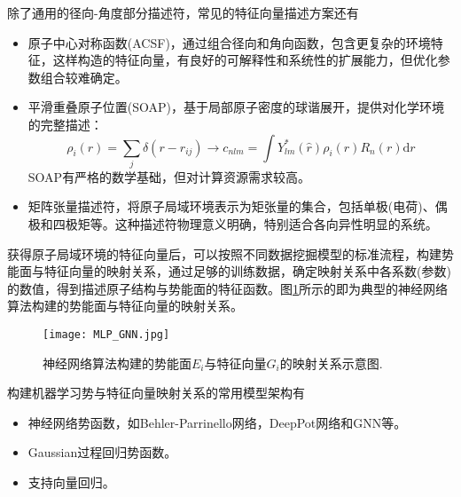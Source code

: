 除了通用的径向-角度部分描述符，常见的特征向量描述方案还有
\begin{itemize}
	\item 原子中心对称函数\textrm{(ACSF)}，通过组合径向和角向函数，包含更复杂的环境特征，这样构造的特征向量，有良好的可解释性和系统性的扩展能力，但优化参数组合较难确定。
	\item 平滑重叠原子位置\textrm{(SOAP)}，基于局部原子密度的球谐展开，提供对化学环境的完整描述：
		\begin{equation}
			\rho_i(r) = \sum_j \delta(r - r_{ij}) \rightarrow c_{nlm} = \int Y^{\ast}_{lm}(\hat{r})\rho_i(r)R_n(r)\mathrm{d}r
	\label{eq:MLP-6}
		\end{equation}
		\textrm{SOAP}有严格的数学基础，但对计算资源需求较高。
	\item 矩阵张量描述符，将原子局域环境表示为矩张量的集合，包括单极(电荷)、偶极和四极矩等。这种描述符物理意义明确，特别适合各向异性明显的系统。
\end{itemize}

获得原子局域环境的特征向量后，可以按照不同数据挖掘模型的标准流程，构建势能面与特征向量的映射关系，通过足够的训练数据，确定映射关系中各系数(参数)的数值，得到描述原子结构与势能面的特征函数。图\ref{MLP-GNN}所示的即为典型的神经网络算法构建的势能面与特征向量的映射关系。
\begin{figure}[h!]
\centering
\vspace*{-0.1in}
\texttt{[image: MLP\_GNN.jpg]}
\caption{神经网络算法构建的势能面$E_i$与特征向量$G_i$的映射关系示意图.}%
\label{MLP-GNN}
\end{figure}

构建机器学习势与特征向量映射关系的常用模型架构有
\begin{itemize}
	\item 神经网络势函数，如\textrm{Behler-Parrinello}网络，\textrm{DeepPot}网络和\textrm{GNN}等。
	\item \textrm{Gaussian}过程回归势函数。
	\item 支持向量回归。
\end{itemize}

%

